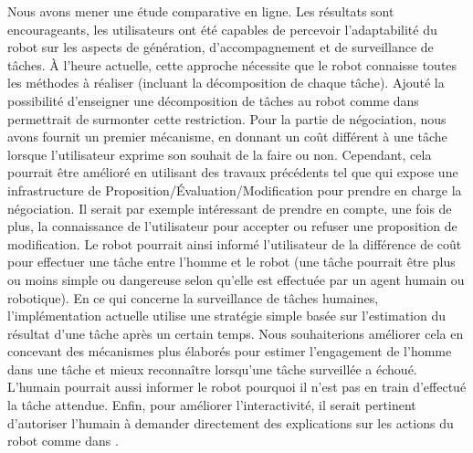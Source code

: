 \documentclass[a4paper,11pt,twoside]{StyleThese}
\begin{document}
Nous avons mener une étude comparative en ligne. Les résultats sont encourageants, les utilisateurs ont été capables de percevoir l'adaptabilité du robot sur les aspects de génération, d'accompagnement et de surveillance de tâches.
%
À l'heure actuelle, cette approche nécessite que le robot connaisse toutes les méthodes à réaliser (incluant la décomposition de chaque tâche). Ajouté la possibilité d'enseigner une décomposition de tâches au robot comme dans  \cite{Mohseni2015} permettrait de surmonter cette restriction.
Pour la partie de négociation, nous avons fournit un premier mécanisme, en donnant un coût différent à une tâche lorsque l'utilisateur exprime son souhait de la faire ou non. Cependant, cela pourrait être amélioré en utilisant des travaux précédents tel que \cite{chu2000conflict} qui expose une infrastructure de Proposition/Évaluation/Modification pour prendre en charge la négociation.
Il serait par exemple intéressant de prendre en compte, une fois de plus, la connaissance de l'utilisateur pour accepter ou refuser une proposition de modification. Le robot pourrait ainsi informé l'utilisateur de la différence de coût pour effectuer une tâche entre l'homme et le robot (une tâche pourrait être plus ou moins simple ou dangereuse selon qu'elle est effectuée par un agent humain ou robotique).
En ce qui concerne la surveillance de tâches humaines, l'implémentation actuelle utilise une stratégie simple basée sur l'estimation du résultat d'une tâche après un certain temps. Nous souhaiterions améliorer cela en concevant des mécanismes plus élaborés pour estimer l'engagement de l'homme dans une tâche et mieux reconnaître lorsqu'une tâche surveillée a échoué. L'humain pourrait aussi informer le robot pourquoi il n'est pas en train d'effectué la tâche attendue.
Enfin, pour améliorer l'interactivité, il serait pertinent d'autoriser l'humain à demander directement des explications sur les actions du robot comme dans  \cite{Lomas2012}.



\ifdefined{}
\else


\end{document}
